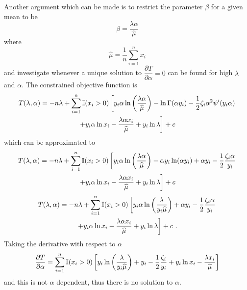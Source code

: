 Another argument which can be made is to restrict the parameter $\beta$ for a given mean to be
\begin{equation}
	\beta = \frac{\lambda\alpha}{\widehat{\mu}}
	\label{eq:compoundPoisson:beta_restrict}
\end{equation}
where
\begin{equation}
	\widehat{\mu} = \frac{1}{n}\sum_{i=1}^n x_i
\end{equation}
and investigate whenever a unique solution to $\dfrac{\partial T}{\partial \alpha} = 0$ can be found for high $\lambda$ and $\alpha$. The constrained objective function is
\begin{multline*}
	T(\lambda,\alpha)
	=
	-n\lambda+
	\sum_{i=1}^n
	\mathbb{I}(x_i>0)
	\left[
	y_i\alpha
	\ln\left(\frac{\lambda\alpha}{\widehat{\mu}}\right)-\ln\Gamma(\alpha y_i) - \frac{1}{2}\zeta_i\alpha^2\psi'(y_i\alpha)
	\right.
	\\
	\left.
		+y_i\alpha\ln x_i - \frac{\lambda\alpha x_i}{\widehat{\mu}}
		+ y_i \ln \lambda
		\vphantom{\frac{1}{1}}
	\right]
	+ c
\end{multline*}
which can be approximated to
\begin{multline*}
	T(\lambda,\alpha)=
	-n\lambda+
	\sum_{i=1}^n
	\mathbb{I}(x_i>0)
	\left[
		y_i\alpha\ln\left(\frac{\lambda\alpha}{\widehat{\mu}}\right)-\alpha y_i\ln(\alpha y_i) + \alpha y_i - \frac{1}{2}\frac{\zeta_i\alpha}{y_i}
	\right.
	\\
	\left.
		+y_i\alpha\ln x_i - \frac{\lambda\alpha x_i}{\widehat{\mu}}
		+ y_i \ln \lambda
		\vphantom{\frac{1}{1}}
	\right]
	+ c
\end{multline*}
\begin{multline*}
	T(\lambda,\alpha)=
	-n\lambda+
	\sum_{i=1}^n
	\mathbb{I}(x_i>0)
	\left[
		y_i\alpha\ln\left(\frac{\lambda}{y_i\widehat{\mu}}\right) + \alpha y_i - \frac{1}{2}\frac{\zeta_i\alpha}{y_i}
	\right.
	\\
	\left.
		+y_i\alpha\ln x_i - \frac{\lambda\alpha x_i}{\widehat{\mu}}
		+ y_i \ln \lambda
		\vphantom{\frac{1}{1}}
	\right]
	+ c
	\ .
\end{multline*}
Taking the derivative with respect to $\alpha$
\begin{equation*}
	\frac{\partial T}{\partial \alpha} =
	\sum_{i=1}^n
	\mathbb{I}(x_i>0)
	\left[
		y_i\ln\left(\frac{\lambda}{y_i\widehat{\mu}}\right)
		+ y_i - \frac{1}{2}\frac{\zeta_i}{y_i}
		+y_i\ln x_i - \frac{\lambda x_i}{\widehat{\mu}}
		\vphantom{\frac{1}{1}}
	\right]
\end{equation*}
and this is not $\alpha$ dependent, thus there is no solution to $\alpha$.